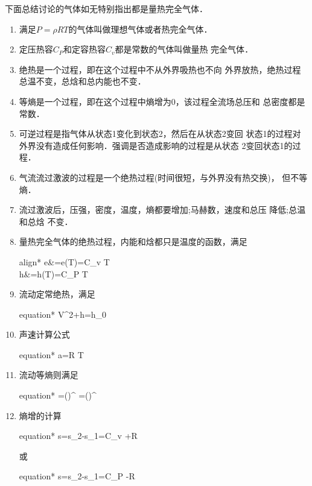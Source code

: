 下面总结讨论的气体如无特别指出都是量热完全气体．
\begin{summary}
	\begin{enumerate}
		\item 满足$P=\rho R T $的气体叫做{\color{red}理想气体或者热完全气体}．
		\item 定压热容$C_P$和定容热容$C_v$都是常数的气体叫做{\color{red}量热
		      完全气体}．
		\item {\color{red}绝热}是一个过程，即在这个过程中不从外界吸热也不向
		      外界放热，绝热过程总温不变，总焓和总内能也不变．
		\item {\color{red}等熵}是一个过程，即在这个过程中熵增为0，该过程全流场总压和
		      总密度都是常数．
		\item {\color{red}可逆过程}是指气体从状态1变化到状态2，然后在从状态2变回
		      状态1的过程对外界没有造成任何影响．强调是否造成影响的过程是从状态
		      2变回状态1的过程．
		\item 气流流过激波的过程是一个绝热过程(时间很短，与外界没有热交换)，
		      但不等熵．
		\item 流过激波后，压强，密度，温度，熵都要{\color{red}增加};马赫数，速度和总压
		      {\color{red}降低};总温和总焓
		      {\color{red}不变}．
		\item 量热完全气体的绝热过程，内能和焓都只是温度的函数，满足
		      \begin{empheq}[box=\bluebox]{align*}
			      e&=e(T)=C_v T \\
			      h&=h(T)=C_P T
		      \end{empheq}
		\item {\color{red}流动定常绝热}，满足
		      \begin{empheq}[box=\bluebox]{equation*}
			      V^2+h=h_0
		      \end{empheq}
		\item {\color{red}声速}计算公式
		      \begin{empheq}[box=\bluebox]{equation*}
			      a=\gamma R T
		      \end{empheq}
		\item {\color{red}流动等熵}则满足
		      \begin{empheq}[box=\bluebox]{equation*}
			      =\left(\right)^\gamma
			      =\left(\right)^{}
		      \end{empheq}
		\item {\color{red}熵增}的计算
		      \begin{empheq}[box=\bluebox]{equation*}
			      \Delta s=s_2-s_1=C_v \ln {}+R \ln {}
		      \end{empheq}
		      或
		      \begin{empheq}[box=\bluebox]{equation*}
			      \Delta s=s_2-s_1=C_P \ln {} -R \ln {}
		      \end{empheq}
	\end{enumerate}
\end{summary}





